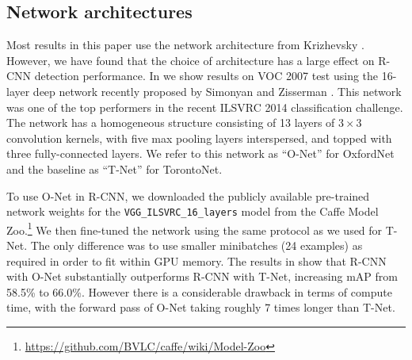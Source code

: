 \subsection{Network architectures}
Most results in this paper use the network architecture from Krizhevsky \etal \cite{krizhevsky2012imagenet}.
However, we have found that the choice of architecture has a large effect on R-CNN detection performance.
In  we show results on VOC 2007 test using the 16-layer deep network recently proposed by Simonyan and Zisserman \cite{vggverydeep}.
This network was one of the top performers in the recent ILSVRC 2014 classification challenge.
The network has a homogeneous structure consisting of 13 layers of $3 \times 3$ convolution kernels,
with five max pooling layers interspersed, and topped with three fully-connected layers.
We refer to this network as ``O-Net'' for OxfordNet and the baseline as ``T-Net'' for TorontoNet.

To use O-Net in R-CNN, we downloaded the publicly available pre-trained network weights for the \texttt{VGG\_ILSVRC\_16\_layers} model from the Caffe Model Zoo.\footnote{\url{https://github.com/BVLC/caffe/wiki/Model-Zoo}}
We then fine-tuned the network using the same protocol as we used for T-Net.
The only difference was to use smaller minibatches (24 examples) as required in order to fit within GPU memory.
The results in  show that R-CNN with O-Net substantially outperforms R-CNN with T-Net, increasing mAP from 58.5\% to 66.0\%.
However there is a considerable drawback in terms of compute time, with the forward pass of O-Net taking roughly 7 times longer than T-Net.
